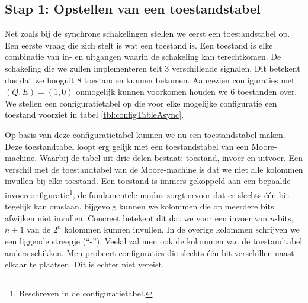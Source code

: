 \subsection{Stap 1: Opstellen van een toestandstabel}
Net zoals bij de synchrone schakelingen stellen we eerst een toestandstabel op. Een eerste vraag die zich stelt is wat een toestand is. Een toestand is elke combinatie van in- en uitgangen waarin de schakeling kan terechtkomen. De schakeling die we zullen implementeren telt 3 verschillende signalen. Dit betekent dus dat we hooguit 8 toestanden kunnen bekomen. Aangezien configuraties met $\left(Q,E\right)=\left(1,0\right)$ onmogelijk kunnen voorkomen houden we 6 toestanden over. We stellen een configuratietabel op die voor elke mogelijke configuratie een toestand voorziet in tabel \ref{tbl:configTableAsync}.
\begin{table}[hbt]
\centering
{}
\caption{Configuratie- en toestandstabel van het leidend voorbeeld.}
\end{table}
Op basis van deze configuratietabel kunnen we nu een toestandstabel maken. Deze toestandtabel loopt erg gelijk met een toestandstabel van een Moore-machine. Waarbij de tabel uit drie delen bestaat: toestand, invoer en uitvoer. Een verschil met de toestandtabel van de Moore-machine is dat we niet alle kolommen invullen bij elke toestand. Een toestand is immers gekoppeld aan een bepaalde invoerconfiguratie\footnote{Beschreven in de configuratietabel.}, de fundamentele modus zorgt ervoor dat er slechts \'e\'en bit tegelijk kan omslaan, bijgevolg kunnen we kolommen die op meerdere bits afwijken niet invullen. Concreet betekent dit dat we voor een invoer van $n$-bits, $n+1$ van de $2^n$ kolommen kunnen invullen. In de overige kolommen schrijven we een liggende streepje (``-''). Veelal zal men ook de kolommen van de toestandtabel anders schikken. Men probeert configuraties die slechts \'e\'en bit verschillen naast elkaar te plaatsen. Dit is echter niet vereist.

